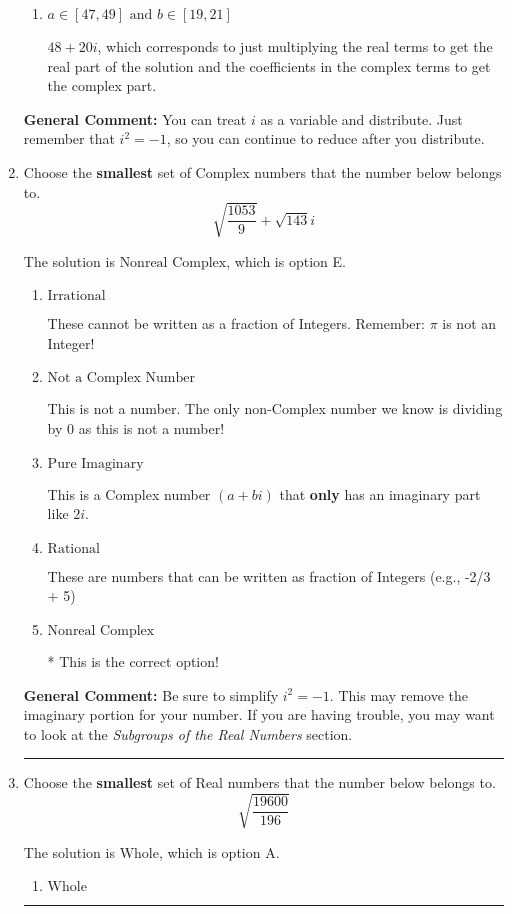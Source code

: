 \documentclass{extbook}[14pt]
\newcommand{\litem}[1]{\item #1

\rule{\textwidth}{0.4pt}}
\begin{document}
\begin{enumerate}
{\begin{enumerate}[label=\Alph*.]
 $28 - 62 i$, which corresponds to adding a minus sign in both terms.
\item \( a \in [47, 49] \text{ and } b \in [19, 21] \)

 $48 + 20 i$, which corresponds to just multiplying the real terms to get the real part of the solution and the coefficients in the complex terms to get the complex part.
\end{enumerate}

\textbf{General Comment:} You can treat $i$ as a variable and distribute. Just remember that $i^2=-1$, so you can continue to reduce after you distribute.
}
\litem{
Choose the \textbf{smallest} set of Complex numbers that the number below belongs to.
\[ \sqrt{\frac{1053}{9}}+\sqrt{143} i \]

The solution is \( \text{Nonreal Complex} \), which is option E.\begin{enumerate}[label=\Alph*.]
\item \( \text{Irrational} \)

These cannot be written as a fraction of Integers. Remember: $\pi$ is not an Integer!
\item \( \text{Not a Complex Number} \)

This is not a number. The only non-Complex number we know is dividing by 0 as this is not a number!
\item \( \text{Pure Imaginary} \)

This is a Complex number $(a+bi)$ that \textbf{only} has an imaginary part like $2i$.
\item \( \text{Rational} \)

These are numbers that can be written as fraction of Integers (e.g., -2/3 + 5)
\item \( \text{Nonreal Complex} \)

* This is the correct option!
\end{enumerate}

\textbf{General Comment:} Be sure to simplify $i^2 = -1$. This may remove the imaginary portion for your number. If you are having trouble, you may want to look at the \textit{Subgroups of the Real Numbers} section.
}
\litem{
Choose the \textbf{smallest} set of Real numbers that the number below belongs to.
\[ \sqrt{\frac{19600}{196}} \]

The solution is \( \text{Whole} \), which is option A.\begin{enumerate}[label=\Alph*.]
\item \( \text{Whole} \)


\end{enumerate}}
\end{enumerate}
\end{document}
